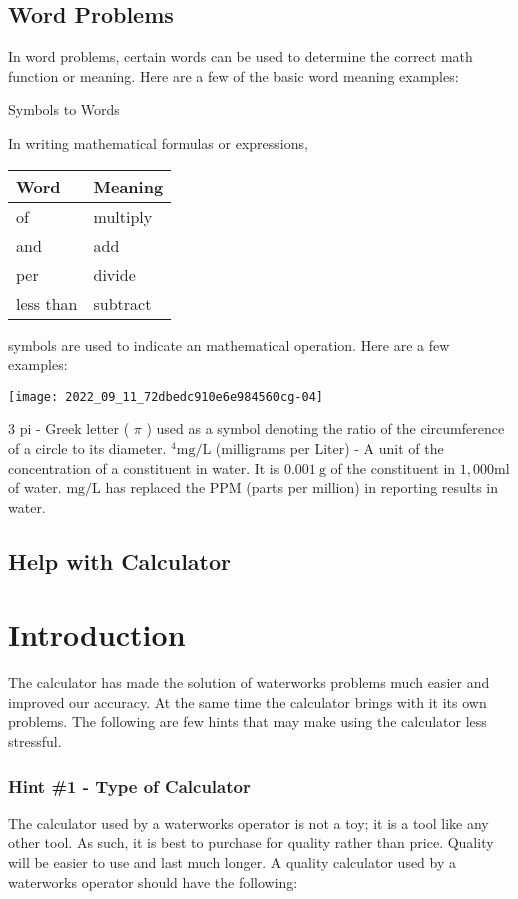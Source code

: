 \subsection{Word Problems}
In word problems, certain words can be used to determine the correct math function or meaning. Here are a few of the basic word meaning examples:

Symbols to Words

In writing mathematical formulas or expressions,

\begin{tabular}{|ll|}
\hline
Word & Meaning \\
\hline
of & multiply \\
and & add \\
per & divide \\
less than & subtract \\
\hline
\end{tabular}

symbols are used to indicate an mathematical operation. Here are a few examples:

\texttt{[image: 2022\_09\_11\_72dbedc910e6e984560cg-04]}

3 pi - Greek letter ( $\pi$ ) used as a symbol denoting the ratio of the circumference of a circle to its diameter. ${ }^{4} \mathrm{mg} / \mathrm{L}$ (milligrams per Liter) - A unit of the concentration of a constituent in water. It is $0.001 \mathrm{~g}$ of the constituent in $1,000 \mathrm{ml}$ of water. $\mathrm{mg} / \mathrm{L}$ has replaced the PPM (parts per million) in reporting results in water.

\subsection{Help with Calculator}
\section{Introduction}
The calculator has made the solution of waterworks problems much easier and improved our accuracy. At the same time the calculator brings with it its own problems. The following are few hints that may make using the calculator less stressful.

\subsubsection{Hint \#1 - Type of Calculator}
The calculator used by a waterworks operator is not a toy; it is a tool like any other tool. As such, it is best to purchase for quality rather than price. Quality will be easier to use and last much longer. A quality calculator used by a waterworks operator should have the following:

